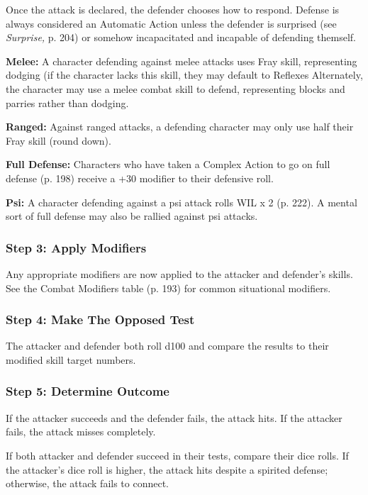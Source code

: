 Once the attack is declared, the defender chooses how 
to respond. Defense is always considered an Automatic 
Action unless the defender is surprised (see \textit{Surprise,}
p. 204) or somehow incapacitated and incapable of 
defending themself.

\textbf{Melee:} A character defending against melee attacks
uses Fray skill, representing dodging (if the
character lacks this skill, they may default to Reflexes
Alternately, the character may use a melee
combat skill to defend, representing blocks and parries
rather than dodging.

\textbf{Ranged: }Against ranged attacks, a defending character
may only use half their Fray skill (round down).

\textbf{Full Defense:} Characters who have taken a Complex
Action to go on full defense (p. 198) receive a
+30 modifier to their defensive roll.

\textbf{Psi: }A character defending against a psi attack rolls 
WIL x 2 (p. 222). A mental sort of full defense may 
also be rallied against psi attacks.

\subsubsection{Step 3: Apply Modifiers}

Any appropriate modifiers are now applied to the 
attacker and defender's skills. See the Combat Modifiers
table (p. 193) for common situational modifiers.

\subsubsection{Step 4: Make The Opposed Test}

The attacker and defender both roll d100 and compare
the results to their modified skill target numbers.

\subsubsection{Step 5: Determine Outcome}

If the attacker succeeds and the defender fails, 
the attack hits. If the attacker fails, the attack 
misses completely.

If both attacker and defender succeed in their 
tests, compare their dice rolls. If the attacker's 
dice roll is higher, the attack hits despite a spirited 
defense; otherwise, the attack fails to connect.

